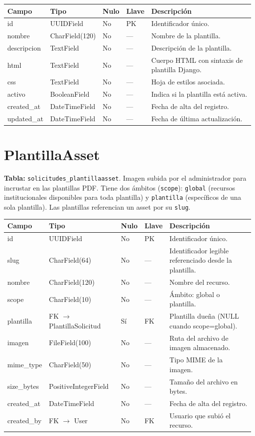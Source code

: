 \documentclass[12pt,letterpaper]{report}
\begin{document}
\begin{longtable}{L{2.9cm} L{2.6cm} C{1.0cm} C{1.0cm} L{6.6cm}}
\toprule
\textbf{Campo} & \textbf{Tipo} & \textbf{Nulo} & \textbf{Llave} & \textbf{Descripción} \\
\midrule
\endhead
id & UUIDField & No & PK & Identificador único. \\
nombre & CharField(120) & No & --- & Nombre de la plantilla. \\
descripcion & TextField & No & --- & Descripción de la plantilla. \\
html & TextField & No & --- & Cuerpo HTML con sintaxis de plantilla Django. \\
css & TextField & No & --- & Hoja de estilos asociada. \\
activo & BooleanField & No & --- & Indica si la plantilla está activa. \\
created\_at & DateTimeField & No & --- & Fecha de alta del registro. \\
updated\_at & DateTimeField & No & --- & Fecha de última actualización. \\
\bottomrule
\end{longtable}

\section{PlantillaAsset}

\textbf{Tabla:} \texttt{solicitudes\_plantillaasset}. Imagen subida por el
administrador para incrustar en las plantillas PDF. Tiene dos ámbitos
(\texttt{scope}): \texttt{global} (recursos institucionales disponibles para
toda plantilla) y \texttt{plantilla} (específicos de una sola plantilla). Las
plantillas referencian un asset por su \texttt{slug}.

\begin{longtable}{L{2.9cm} L{2.6cm} C{1.0cm} C{1.0cm} L{6.6cm}}
\toprule
\textbf{Campo} & \textbf{Tipo} & \textbf{Nulo} & \textbf{Llave} & \textbf{Descripción} \\
\midrule
\endhead
id & UUIDField & No & PK & Identificador único. \\
slug & CharField(64) & No & --- & Identificador legible referenciado desde la plantilla. \\
nombre & CharField(120) & No & --- & Nombre del recurso. \\
scope & CharField(10) & No & --- & Ámbito: global o plantilla. \\
plantilla & FK $\rightarrow$ PlantillaSolicitud & Sí & FK & Plantilla dueña (NULL cuando scope=global). \\
imagen & FileField(100) & No & --- & Ruta del archivo de imagen almacenado. \\
mime\_type & CharField(50) & No & --- & Tipo MIME de la imagen. \\
size\_bytes & PositiveIntegerField & No & --- & Tamaño del archivo en bytes. \\
created\_at & DateTimeField & No & --- & Fecha de alta del registro. \\
created\_by & FK $\rightarrow$ User & No & FK & Usuario que subió el recurso. \\
\bottomrule
\end{longtable}
\end{document}
